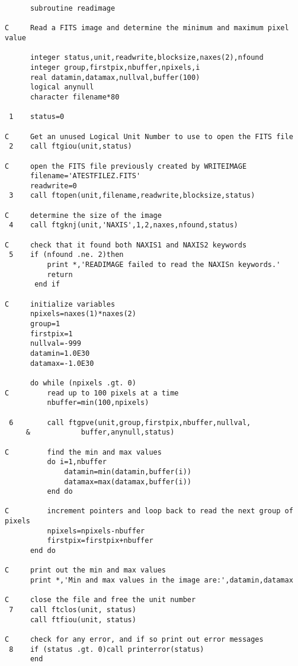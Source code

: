 \begin{verbatim}
      subroutine readimage

C     Read a FITS image and determine the minimum and maximum pixel value

      integer status,unit,readwrite,blocksize,naxes(2),nfound
      integer group,firstpix,nbuffer,npixels,i
      real datamin,datamax,nullval,buffer(100)
      logical anynull
      character filename*80

 1    status=0

C     Get an unused Logical Unit Number to use to open the FITS file
 2    call ftgiou(unit,status)

C     open the FITS file previously created by WRITEIMAGE
      filename='ATESTFILEZ.FITS'
      readwrite=0
 3    call ftopen(unit,filename,readwrite,blocksize,status)

C     determine the size of the image
 4    call ftgknj(unit,'NAXIS',1,2,naxes,nfound,status)

C     check that it found both NAXIS1 and NAXIS2 keywords
 5    if (nfound .ne. 2)then
          print *,'READIMAGE failed to read the NAXISn keywords.'
          return
       end if

C     initialize variables
      npixels=naxes(1)*naxes(2)
      group=1
      firstpix=1
      nullval=-999
      datamin=1.0E30
      datamax=-1.0E30

      do while (npixels .gt. 0)
C         read up to 100 pixels at a time 
          nbuffer=min(100,npixels)
      
 6        call ftgpve(unit,group,firstpix,nbuffer,nullval,
     &            buffer,anynull,status)

C         find the min and max values
          do i=1,nbuffer
              datamin=min(datamin,buffer(i))
              datamax=max(datamax,buffer(i))
          end do

C         increment pointers and loop back to read the next group of pixels
          npixels=npixels-nbuffer
          firstpix=firstpix+nbuffer
      end do

C     print out the min and max values
      print *,'Min and max values in the image are:',datamin,datamax

C     close the file and free the unit number
 7    call ftclos(unit, status)
      call ftfiou(unit, status)

C     check for any error, and if so print out error messages
 8    if (status .gt. 0)call printerror(status)
      end
\end{verbatim}
\normalsize
\newpage
